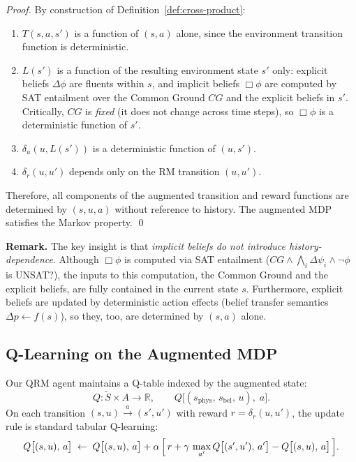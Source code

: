 \documentclass[11pt]{article}
\newcommand{\EBel}[1]{\ensuremath{\Delta #1}} %
\newcommand{\IBel}[1]{\ensuremath{\Box #1}}   %
\newcommand{\CG}{\ensuremath{\mathit{CG}}}    %
\begin{document}
\begin{proof}
By construction of Definition~\ref{def:cross-product}:
\begin{enumerate}
    \item $T(s,a,s')$ is a function of $(s, a)$ alone, since the environment transition function is deterministic.
    \item $L(s')$ is a function of the resulting environment state $s'$ only: explicit beliefs $\EBel{\phi}$ are fluents within $s$, and implicit beliefs $\IBel{\phi}$ are computed by SAT entailment over the Common Ground $\CG$ and the explicit beliefs in $s'$.  Critically, $\CG$ is \emph{fixed} (it does not change across time steps), so $\IBel{\phi}$ is a deterministic function of $s'$.
    \item $\delta_u(u, L(s'))$ is a deterministic function of $(u, s')$.
    \item $\delta_r(u, u')$ depends only on the RM transition $(u, u')$.
\end{enumerate}
Therefore, all components of the augmented transition and reward functions are determined by $(s, u, a)$ without reference to history. The augmented MDP satisfies the Markov property. \qed
\end{proof}

\noindent\textbf{Remark.}
The key insight is that \emph{implicit beliefs do not introduce history-dependence}.  Although $\IBel{\phi}$ is computed via SAT entailment ($\CG \land \bigwedge_i \EBel{\psi_i} \land \neg\phi$ is UNSAT?), the inputs to this computation, the Common Ground and the explicit beliefs, are fully contained in the current state $s$.  Furthermore, explicit beliefs are updated by deterministic action effects (belief transfer semantics $\EBel{p} \gets f(s)$), so they, too, are determined by $(s, a)$ alone.

\subsection{Q-Learning on the Augmented MDP}

Our QRM agent maintains a Q-table indexed by the augmented state:
\[
    Q : \tilde{S} \times A \to \mathbb{R}, \qquad
    Q\bigl[(s_{\mathrm{phys}},\, s_{\mathrm{bel}},\, u),\; a\bigr].
\]
On each transition $(s, u) \xrightarrow{a} (s', u')$ with reward $r = \delta_r(u, u')$, the update rule is standard tabular Q-learning:
\begin{equation}
\label{eq:q-update}
Q\bigl[(s, u),\, a\bigr] \;\leftarrow\; Q\bigl[(s, u),\, a\bigr] + \alpha\,\Bigl[\, r + \gamma\,\max_{a'} Q\bigl[(s', u'),\, a'\bigr] - Q\bigl[(s, u),\, a\bigr]\,\Bigr].
\end{equation}
\end{document}
